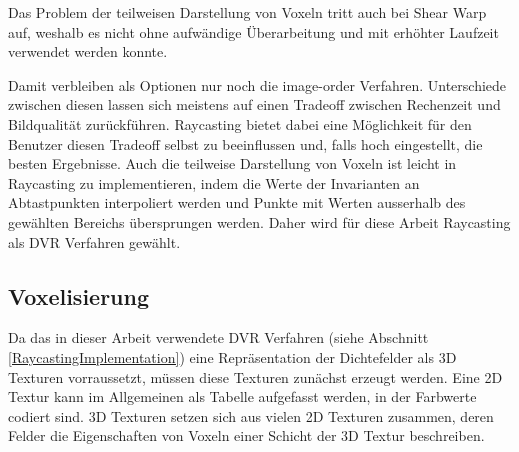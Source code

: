 \documentclass[a4paper,fontsize=12pt,toc=bib,halfparskip]{scrartcl}
\begin{document}
Das Problem der teilweisen Darstellung von Voxeln tritt auch bei Shear Warp auf, weshalb es nicht ohne aufw\"andige \"Uberarbeitung und mit erh\"ohter Laufzeit verwendet werden konnte.

Damit verbleiben als Optionen nur noch die image-order Verfahren. Unterschiede zwischen diesen lassen sich meistens auf einen Tradeoff zwischen Rechenzeit und Bildqualit\"at zur\"uckf\"uhren. Raycasting bietet dabei eine M\"oglichkeit f\"ur den Benutzer diesen Tradeoff selbst zu beeinflussen und, falls hoch eingestellt, die besten Ergebnisse. Auch die teilweise Darstellung von Voxeln ist leicht in Raycasting zu implementieren, indem die Werte der Invarianten an Abtastpunkten interpoliert werden und Punkte mit Werten ausserhalb des gew\"ahlten Bereichs \"ubersprungen werden. Daher wird f\"ur diese Arbeit Raycasting als DVR Verfahren gew\"ahlt.

\subsection{Voxelisierung}
Da das in dieser Arbeit verwendete DVR Verfahren (siehe Abschnitt \ref{RaycastingImplementation}) eine Repr\"asentation der Dichtefelder als 3D Texturen vorraussetzt, m\"ussen diese Texturen zun\"achst erzeugt werden. Eine 2D Textur kann im Allgemeinen als Tabelle aufgefasst werden, in der Farbwerte codiert sind. 3D Texturen setzen sich aus vielen 2D Texturen zusammen, deren Felder die Eigenschaften von Voxeln einer Schicht der 3D Textur beschreiben. 
\end{document}
